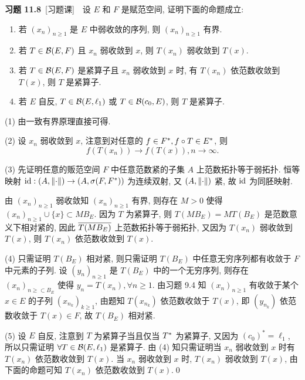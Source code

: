 	\textbf{习题 11.8}\ [习题课]\ \ 设 $ E $ 和 $ F $ 是赋范空间, 证明下面的命题成立:
	\begin{enumerate}[(1)]
		\item 若 $ (x_{n})_{n\geqslant1} $ 是 $ E $ 中弱收敛的序列, 则 $ (x_{n})_{n\geqslant1} $ 有界.
		\item 若 $ T\in\CB(E, F) $ 且 $ x_{n} $ 弱收敛到 $ x $, 则 $ T(x_{n}) $ 弱收敛到 $ T(x) $.
		\item 若 $ T\in\CB(E, F) $ 是紧算子且 $ x_{n} $ 弱收敛到 $ x $ 时, 有 $ T(x_{n}) $ 依范数收敛到 $ T(x) $, 则 $ T $ 是紧算子. 
		\item 若 $ E $ 自反, $ T\in\CB(E, \ell_{1}) $ 或 $ T\in\CB(c_{0}, E) $, 则 $ T $ 是紧算子.
	\end{enumerate}
	\begin{Proof}
		(1) 由一致有界原理直接可得.

		(2) 设 $ x_{n} $ 弱收敛到 $ x $, 注意到对任意的 $ f\in\Star{F}, f\circ T\in\Star{E} $, 则
		\[
			f(T(x_{n}))\to f(T(x)), n\to\infty.
		\]

		(3) 先证明任意的贩范空间 $ F $ 中任意范数紧的子集 $ A $ 上范数拓扑等于弱拓扑. 恒等映射 $ \id: (A, \norm{\cdot})\to (A, \sigma(F, \Star{F})) $ 为连续双射, 又 $ (A, \norm{\cdot}) $ 紧, 故 $ \id $ 为同胚映射.
		
		由 $ (x_{n})_{n\geqslant1} $ 弱收敛知 $ (x_{n})_{n\geqslant1} $ 有界, 则存在 $ M>0 $ 使得 $ (x_{n})_{n\geqslant 1}\cup\{ x \}\subset MB_{E} $. 因为 $ T $ 为紧算子, 则 $ T(MB_{E})=MT(B_{E}) $ 是范数意义下相对紧的, 因此 $ \baro{T(MB_{E})} $ 上范数拓扑等于弱拓扑, 又因为 $ T(x_{n}) $ 弱收敛到 $ T(x) $, 则 $ T(x_{n}) $ 依范数收敛到 $ T(x) $.

		(4) 只需证明 $ T(B_{E}) $ 相对紧, 则只需证明 $ T(B_{E}) $ 中任意无穷序列都有收敛于 $ F $ 中元素的子列. 设 $ (y_{n})_{n\geqslant1} $ 是 $ T(B_{E}) $ 中的一个无穷序列, 则存在 $ (x_{n})_{n\geqslant \subset B_{E}} $ 使得 $ y_{n}=T(x_{n}), \forall n\geqslant1 $. 由习题 9.4 知 $ (x_{n})_{n\geqslant1} $ 有收敛于某个 $ x\in E $ 的子列 $ (x_{n_{k}})_{k\geqslant1} $, 由题知 $ T(x_{n_{k}}) $ 依范数收敛于 $ T(x) $, 即 $ (y_{n_{k}}) $ 依范数收敛于 $ T(x)\in F $, 故 $ T(B_{E}) $ 相对紧.

		(5) 设 $ E $ 自反, 注意到 $ T $ 为紧算子当且仅当 $ \Star{T} $ 为紧算子, 又因为 $ (c_{0})^{*}=\ell_{1} $, 所以只需证明 $ \forall T\in \CB(E, \ell_{1}) $ 是紧算子. 由 (4) 知只需证明当 $ x_{n} $ 弱收敛到 $ x $ 时有 $ T(x_{n}) $ 依范数收敛到 $ T(x) $. 当 $ x_{n} $ 弱收敛到 $ x $ 时, $ T(x_{n}) $ 弱收敛到 $ T(x) $, 由下面的命题可知 $ T(x_{n}) $ 依范数收敛到 $ T(x) $.\qed
	\end{Proof}
